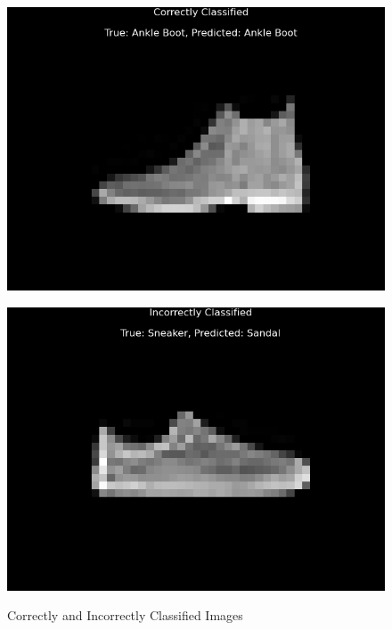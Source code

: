 \documentclass[a4paper]{article}
\begin{document}
\begin{sloppypar}
\begin{enumerate}[start=4,label=Q\arabic*,left=0pt]
    \begin{figure}[H]
        \centering
        \begin{minipage}[b]{0.45\textwidth}
            \centering  
            \includegraphics[height=0.2\textheight]{Q4_correct.png}
            \caption{Correctly and Incorrectly Classified Images}
            \label{fig:Q4_correct}
        \end{minipage}
        \hspace{0.05\textwidth}
        \begin{minipage}[b]{0.45\textwidth}
            \centering  
            \includegraphics[height=0.2\textheight]{Q4_incorrect.png}
            \label{fig:Q4_incorrect}
        \end{minipage}
    \end{figure}


\end{enumerate}
\end{sloppypar}
\end{document}
